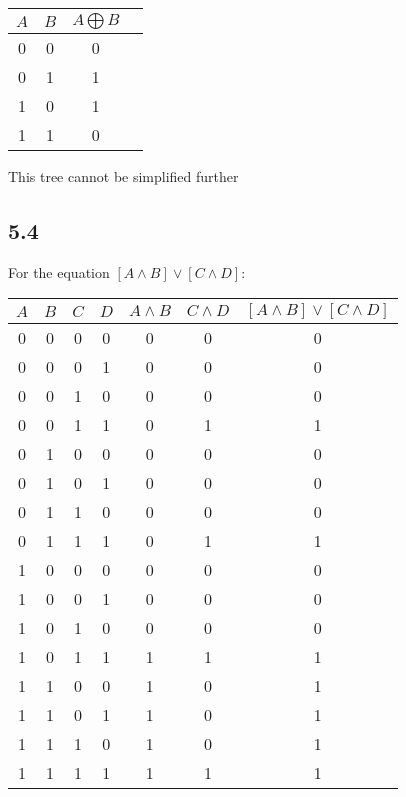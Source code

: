 \documentclass[10pt,a4paper]{article}
\begin{document}
\begin{tabular}{|c|c|c|c|}
\hline
$A$ & $B$ & $A\bigoplus B$ \\
\hline
0 & 0 & 0 \\
0 & 1 & 1 \\
1 & 0 & 1 \\
1 & 1 & 0 \\
\hline
\end{tabular}


This tree cannot be simplified further

\subsection{5.4}
For the equation $[A \wedge B]\vee[C \wedge D]$:

\begin{tabular}{|c|c|c|c|c|c|c|}
\hline
$A$ & $B$ & $C$ & $D$ & $A \wedge B$ & $C \wedge D$ & $[A \wedge B]\vee[C \wedge D]$\\
\hline
0 & 0 & 0 & 0 & 0 & 0 & 0 \\

0 & 0 & 0 & 1 & 0 & 0 & 0 \\
0 & 0 & 1 & 0 & 0 & 0 & 0 \\
0 & 0 & 1 & 1 & 0 & 1 & 1 \\
0 & 1 & 0 & 0 & 0 & 0 & 0 \\
0 & 1 & 0 & 1 & 0 & 0 & 0 \\
0 & 1 & 1 & 0 & 0 & 0 & 0 \\
0 & 1 & 1 & 1 & 0 & 1 & 1 \\
1 & 0 & 0 & 0 & 0 & 0 & 0 \\
1 & 0 & 0 & 1 & 0 & 0 & 0 \\
1 & 0 & 1 & 0 & 0 & 0 & 0 \\
1 & 0 & 1 & 1 & 1 & 1 & 1 \\
1 & 1 & 0 & 0 & 1 & 0 & 1 \\
1 & 1 & 0 & 1 & 1 & 0 & 1 \\
1 & 1 & 1 & 0 & 1 & 0 & 1 \\
1 & 1 & 1 & 1 & 1 & 1 & 1 \\
\hline
\end{tabular}
\end{document}
